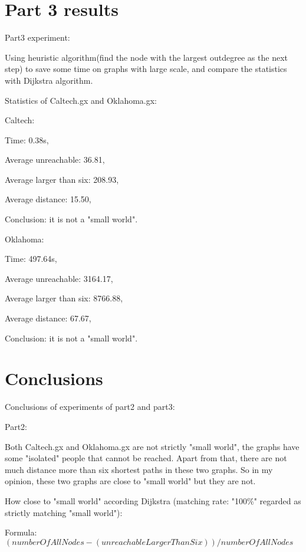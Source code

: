 \documentclass{article}
\begin{document}

\section{Part 3 results}
\label{sec:part3}
Part3 experiment:

Using heuristic algorithm(find the node with the largest outdegree as the next step) to save some time on 
graphs with large scale, and compare the statistics with Dijkstra algorithm.

Statistics of Caltech.gx and Oklahoma.gx:

  Caltech: 
           
           Time: 0.38s,

           Average unreachable: 36.81,

           Average larger than six: 208.93,

           Average distance: 15.50,

           Conclusion: it is not a "small world".

  Oklahoma: 
             
            Time: 497.64s, 

            Average unreachable: 3164.17,

            Average larger than six: 8766.88,

            Average distance: 67.67,

            Conclusion: it is not a "small world".

\section{Conclusions}
\label{sec:conclusions}
Conclusions of experiments of part2 and part3:

Part2:

Both Caltech.gx and Oklahoma.gx are not strictly "small world", the graphs have some "isolated" people that
cannot be reached. Apart from that, there are not much distance more than six shortest paths in these
two graphs. So in my opinion, these two graphs are close to "small world" but they are not.

How close to "small world" according Dijkstra (matching rate: "100\%" regarded as strictly matching "small world"):

Formula: $(numberOfAllNodes - (unreachableLargerThanSix)) / numberOfAllNodes$
\end{document}
